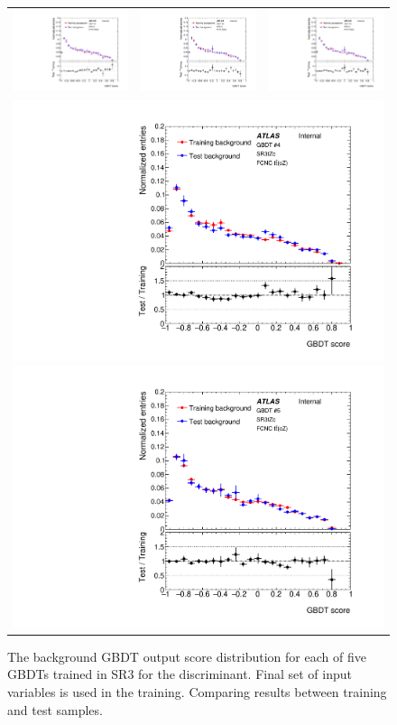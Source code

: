 \begin{figure}[!htbp]
	\centering
	\begin{tabular}{ccc}
		\includegraphics[width=.295\textwidth]{Chapters/CH5/figures/SR3_UsingSMT/BDT/GBDT_background_Fold1} &
		\includegraphics[width=.295\textwidth]{Chapters/CH5/figures/SR3_UsingSMT/BDT/GBDT_background_Fold2} &
		\includegraphics[width=.295\textwidth]{Chapters/CH5/figures/SR3_UsingSMT/BDT/GBDT_background_Fold3} \\
		\multicolumn{3}{c}{
		\includegraphics[width=.295\textwidth]{Chapters/CH5/figures/SR3_UsingSMT/BDT/GBDT_background_Fold4}
		\includegraphics[width=.295\textwidth]{Chapters/CH5/figures/SR3_UsingSMT/BDT/GBDT_background_Fold5}} \\
	\end{tabular}
	\caption{ The background GBDT output score distribution for each of five GBDTs trained in SR3 for the \Dthree discriminant.
		Final set of input variables is used in the training.
		Comparing results between training and test samples.
	}%
	\label{app:BDT:fig:SR3:GBDTbkgFinalSet}
\end{figure}

